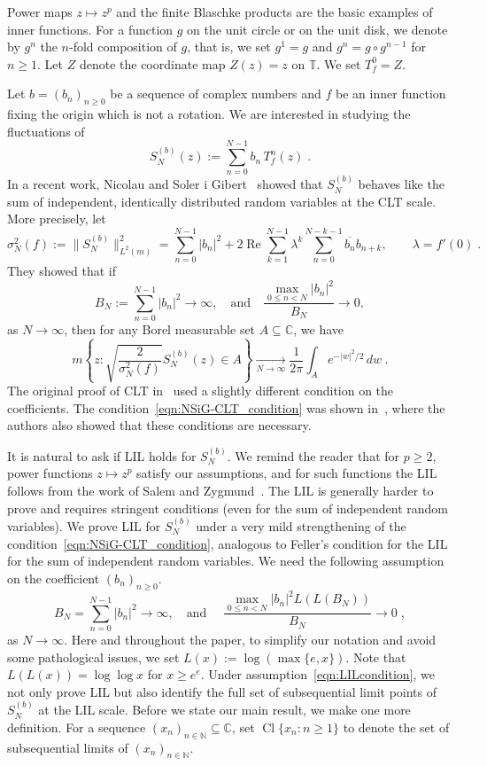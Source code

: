 \documentclass[12pt, reqno, final, a4paper]{amsart}
\theoremstyle{plain}
\theoremstyle{definition}
\theoremstyle{remark}
\DeclareMathOperator{\Ree}{Re}
\DeclareMathOperator{\Cl}{Cl}
\newcommand{\T}{\mathbb T}
\newcommand{\C}{\mathbb C}
\newcommand{\1}{\mathbf 1}
\begin{document}
Power maps $z\mapsto z^p$ and the finite Blaschke products are the basic examples of inner functions. For a function $g$ on the unit circle or on the unit disk, we denote by $g^n$ the $n$-fold composition of $g$, that is, we set $g^1=g$ and $g^n=g\circ g^{n-1}$ for $n\geq 1$. Let $Z$ denote the coordinate map $Z(z)=z$ on $\T$. We set $T_f^{0}=Z$. 

Let $b=(b_n)_{n\geq 0}$ be a sequence of complex numbers and $f$ be an inner function fixing the origin which is not a rotation. We are interested in studying the fluctuations of 
\[
S_N^{(b)}(z) := \sum_{n=0}^{N-1}b_n\,T_f^{n}(z)\;.
\]
In a recent work, Nicolau and Soler i Gibert~\cite{NicolauSoler2022} showed that $S_N^{(b)}$ behaves like the sum of independent, identically distributed random variables at the CLT scale. More precisely, let 
\[
\sigma_N^2(f) := \|S_{N}^{(b)}\|_{L^2(m)}^2
= \sum_{n=0}^{N-1}|b_n|^2
 +2\Ree\sum_{k=1}^{N-1}\lambda^k
       \sum_{n=0}^{N-k-1}\overline{b_n}b_{n+k},
\qquad \lambda=f'(0)\;.
\]
They showed that if 
\begin{equation}
\label{eqn:NSiG-CLT_condition}
    B_N:=\sum_{n=0}^{N-1}|b_n|^2\to \infty, \quad \text{and}\quad \frac{\max_{0\leq n<N}|b_n|^2}{B_{N}}\to 0,  
\end{equation}
as $N\to \infty$, then for any Borel measurable set $A\subseteq \mathbb{C}$, we have
\[
m\left\{z:\sqrt{\frac{2}{\sigma_N^2(f)}}S_N^{(b)}(z)\in A\right\}
\xrightarrow[N\to\infty]{}
\frac{1}{2\pi}\int_A e^{-|w|^2/2}\,dw\;.
\]
The original proof of CLT in~\cite{NicolauSoler2022} used a slightly different condition on the coefficients. The condition~\eqref{eqn:NSiG-CLT_condition} was shown in~\cite{NicolauSoler2026}, where the authors also showed that these conditions are necessary. 


It is natural to ask if LIL holds for $S_N^{(b)}$. We remind the reader that for $p\geq 2$, power functions $z\mapsto z^p$ satisfy our assumptions, and for such functions the LIL follows from the work of Salem and Zygmund~\cite{SalemZygmund1950}. The LIL is generally harder to prove and requires stringent conditions (even for the sum of independent random variables). We prove LIL for $S_N^{(b)}$ under a very mild strengthening of the condition~\eqref{eqn:NSiG-CLT_condition}, analogous to Feller's condition for the LIL for the sum of independent random variables. We need the following assumption on the coefficient $(b_{n})_{n\geq 0}$. 
\begin{equation}
\label{eqn:LILcondition}
 B_{N}=\sum_{n=0}^{N-1}|b_n|^2\to \infty, \quad \text{and }\quad
 \frac{\max_{0\le n<N}|b_n|^2 L(L(B_N))}{B_N}\to 0\;,
\end{equation}
as $N\to \infty$. Here and throughout the paper, to simplify our notation and avoid some pathological issues, we set $L(x):=\log(\max\{e, x\})$. Note that $L(L(x))=\log\log x$ for $x\geq e^e$. Under assumption~\eqref{eqn:LILcondition}, we not only prove LIL but also identify the full set of subsequential limit points of $S_N^{(b)}$ at the LIL scale. Before we state our main result, we make one more definition. For a sequence $(x_n)_{n\in \mathbb{N}}\subseteq \C$, set $\Cl\{x_n:n\ge 1\}$ to denote the set of subsequential limits of $(x_n)_{n\in \mathbb{N}}$. 
\end{document}
